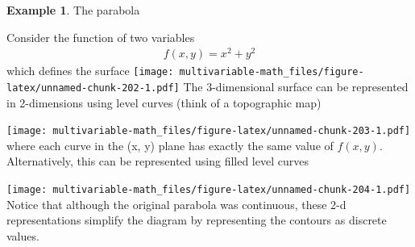 \documentclass[
]{book}
\newenvironment{Shaded}{\begin{snugshade}}{\end{snugshade}}
\newcommand{\DataTypeTok}[1]{\textcolor[rgb]{0.13,0.29,0.53}{#1}}
\newcommand{\DecValTok}[1]{\textcolor[rgb]{0.00,0.00,0.81}{#1}}
\newcommand{\KeywordTok}[1]{\textcolor[rgb]{0.13,0.29,0.53}{\textbf{#1}}}
\newcommand{\NormalTok}[1]{#1}
\newcommand{\OperatorTok}[1]{\textcolor[rgb]{0.81,0.36,0.00}{\textbf{#1}}}
\newcommand{\StringTok}[1]{\textcolor[rgb]{0.31,0.60,0.02}{#1}}
\theoremstyle{definition}
\theoremstyle{definition}
\newtheorem{example}{Example}[chapter]
\theoremstyle{definition}
\theoremstyle{definition}
\theoremstyle{remark}
\begin{document}
\begin{example}
The parabola

Consider the function of two variables
\[
\begin{aligned}
f(x, y) = x^2 + y^2
\end{aligned}
\]
which defines the surface
\texttt{[image: multivariable-math\_files/figure-latex/unnamed-chunk-202-1.pdf]}
The 3-dimensional surface can be represented in 2-dimensions using level curves (think of a topographic map)

\begin{Shaded}
\end{Shaded}

\texttt{[image: multivariable-math\_files/figure-latex/unnamed-chunk-203-1.pdf]}
where each curve in the (x, y) plane has exactly the same value of \(f(x, y)\). Alternatively, this can be represented using filled level curves

\begin{Shaded}
\end{Shaded}

\texttt{[image: multivariable-math\_files/figure-latex/unnamed-chunk-204-1.pdf]}
Notice that although the original parabola was continuous, these 2-d representations simplify the diagram by representing the contours as discrete values.
\end{example}
\end{document}

